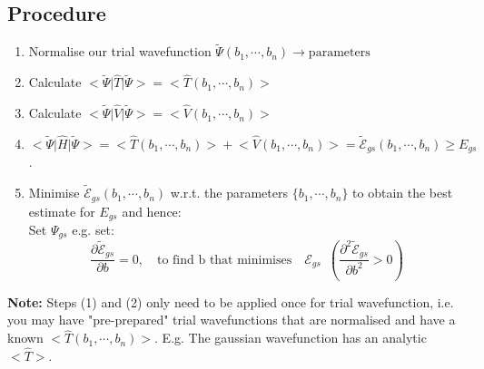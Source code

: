 \documentclass[12pt,fancychapters]{report}
\numberwithin{equation}{section}
\begin{document}
\subsection{Procedure}
\begin{enumerate}
  \item Normalise our trial wavefunction $\tilde{\Psi}(b_1,\cdots,b_n)\rightarrow
    \text{parameters}$
  \item Calculate $\big<\tilde{\Psi}\big|\hat{T}\big|\tilde{\Psi}\big> = \big<\hat{T}
    (b_1, \cdots,b_n)\big>$
  \item Calculate $\big<\tilde{\Psi}\big|\hat{V}\big|\tilde{\Psi}\big>
    = \big<\hat{V}
    (b_1, \cdots,b_n)\big>$
  \item $\big<\tilde{\Psi}\big|\hat{H}\big|\tilde{\Psi}\big> =
    \big<\hat{T}
    (b_1, \cdots,b_n)\big> + \big<\hat{V}
  (b_1, \cdots,b_n)\big>=\tilde{\mathcal{E}}_{gs}(b_1, \cdots, b_n) \geq E_{gs} $.
  \item Minimise $\tilde{\mathcal{E}}_{gs}(b_1, \cdots, b_n) $ w.r.t. the parameters 
    $\{b_1, \cdots, b_n\}$ to obtain the best estimate for $E_{gs}$ and hence:\\
    Set $\Psi_{gs}$ e.g. set:\\
    \[\frac{\partial \tilde{\mathcal{E}}_{gs}}{\partial b} = 0, \quad \text{to find b that minimises}
    \quad \mathcal{E}_{gs}\,\,\,\left(\frac{\partial^2 \tilde{\mathcal{E}}_{gs}}{\partial b^2}
  >0\right)\]
\end{enumerate}
\textbf{Note: } Steps (1) and (2) only need to be applied once for trial wavefunction,
i.e. you may have "pre-prepared" trial wavefunctions that are normalised and have a known 
$\big<\hat{T}(b_1, \cdots,b_n)\big> $. E.g. The gaussian wavefunction has an analytic $\big<
\hat{T}\big>$.
\end{document}
